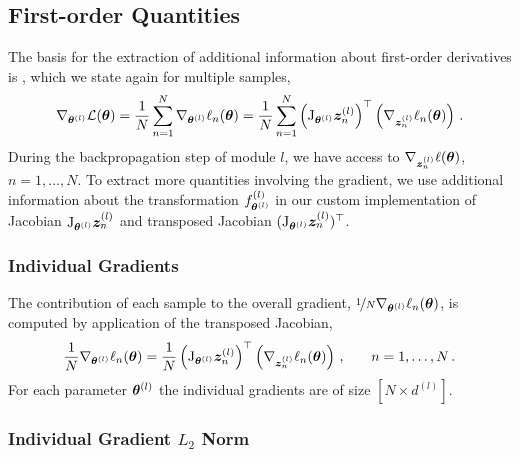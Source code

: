 \subsection{First-order Quantities}
\label{backpack::app:first-order-extensions}
The basis for the extraction of additional information about first-order
derivatives is , which we state
again for multiple samples,
\begin{align*}
  \begin{split}
    \nabla_{{\bm{\theta}}^{(l)}}\mathcal{L} ({\bm{\theta}})
    =
    \frac{1}{N} \sum_{n=1}^{N}
    \nabla_{{\bm{\theta}}^{(l)}}\ell_n({\bm{\theta}})
    =
    \frac{1}{N} \sum_{n=1}^{N}
    \left(\mathrm{J}_{{\bm{\theta}}^{(l)}} {\bm{z}}^{(l)}_n\right)^\top
    \left(\nabla_{{\bm{z}}^{(l)}_n}\ell_n({\bm{\theta}})\right)\,{.}
  \end{split}
\end{align*}
During the backpropagation step of module $l$, we have access to
$\nabla_{{\bm{z}}^{(l)}_n}\ell({\bm{\theta}})$, $n=1,\dots, N$. To extract more quantities
involving the gradient, we use additional information about the transformation
$f^{(l)}_{{\bm{\theta}}^{(l)}}$ in our custom implementation of Jacobian
$\mathrm{J}_{{\bm{\theta}}^{(l)}} {\bm{z}}^{(l)}_n$ and transposed Jacobian
$(\mathrm{J}_{{\bm{\theta}}^{(l)}} {\bm{z}}^{(l)}_n)^\top$.

\subsubsection{Individual Gradients}

The contribution of each sample to the overall gradient, $\nicefrac{1}{N}
\nabla_{{\bm{\theta}}^{(l)}}\ell_n({\bm{\theta}})$, is computed by application of the
transposed Jacobian,
\begin{align}
  \frac{1}{N} \nabla_{{\bm{\theta}}^{(l)}}\ell_n({\bm{\theta}})
  =
  \frac{1}{N}
  \left(\mathrm{J}_{{\bm{\theta}}^{(l)}} {\bm{z}}^{(l)}_n\right)^\top
  \left(\nabla_{{\bm{z}}^{(l)}_n}\ell_n({\bm{\theta}})\right)\,{,} \qquad n=1,\dots,N\,{.}
  \label{backpack::equ:individual_gradients}
\end{align}
For each parameter ${\bm{\theta}}^{(l)}$ the individual gradients are of size $[N \times d^{(l)}]$.

\subsubsection{Individual Gradient $L_2$ Norm}

